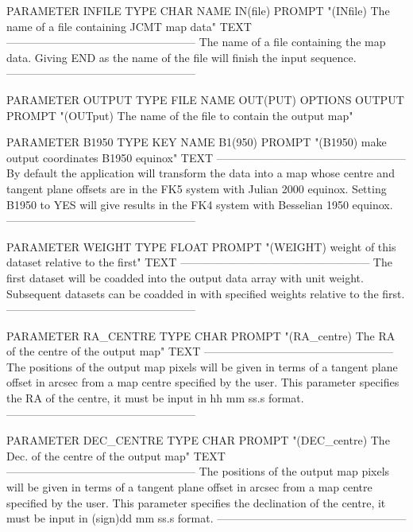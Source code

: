 \documentclass[twoside,11pt,nolof]{starlink}
\begin{document}
\begin{small}
\begin{terminalv}
PARAMETER  INFILE
  TYPE    CHAR
  NAME    IN(file)
  PROMPT  "(INfile) The name of a file containing JCMT map data"
  TEXT   ---------------------------------------------------
         The name of a file containing the map data. Giving
         END as the name of the file will finish the input
         sequence.
         ---------------------------------------------------

PARAMETER  OUTPUT
  TYPE    FILE
  NAME    OUT(PUT)
  OPTIONS OUTPUT
  PROMPT  "(OUTput) The name of the file to contain the output map"

PARAMETER B1950
  TYPE    KEY
  NAME    B1(950)
  PROMPT "(B1950) make output coordinates B1950 equinox"
  TEXT   ---------------------------------------------------
         By default the application will transform the data
         into a map whose centre and tangent plane offsets
         are in the FK5 system with Julian 2000 equinox.
         Setting B1950 to YES will give results in the FK4
         system with Besselian 1950 equinox.
         ---------------------------------------------------

PARAMETER WEIGHT
  TYPE   FLOAT
  PROMPT "(WEIGHT) weight of this dataset relative to the first"
  TEXT   ---------------------------------------------------
         The first dataset will be coadded into the output
         data array with unit weight. Subsequent datasets
         can be coadded in with specified weights relative
         to the first.
         ---------------------------------------------------

PARAMETER RA_CENTRE
  TYPE   CHAR
  PROMPT "(RA_centre) The RA of the centre of the output map"
  TEXT   ---------------------------------------------------
         The positions of the output map pixels will be
         given in terms of a tangent plane offset in arcsec
         from a map centre specified by the user. This parameter
         specifies the RA of the centre, it must be input in
         hh mm ss.s format.
         ---------------------------------------------------

PARAMETER DEC_CENTRE
  TYPE   CHAR
  PROMPT "(DEC_centre) The Dec. of the centre of the output map"
  TEXT   ---------------------------------------------------
         The positions of the output map pixels will be
         given in terms of a tangent plane offset in arcsec
         from a map centre specified by the user. This parameter
         specifies the declination of the centre, it must be
         input in (sign)dd mm ss.s format.
         ---------------------------------------------------
\end{terminalv}
\end{small}
\end{document}
